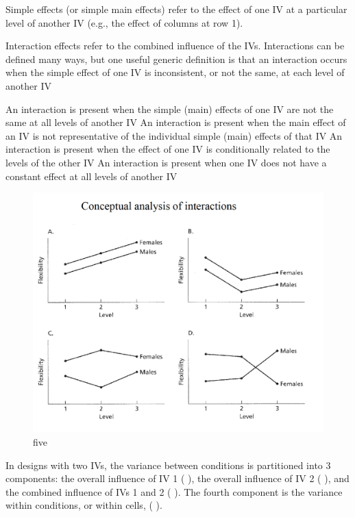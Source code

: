 \documentclass[]{book}
\theoremstyle{definition}
\theoremstyle{definition}
\theoremstyle{definition}
\theoremstyle{remark}
\begin{document}
Simple effects (or simple main effects) refer to the effect of one IV at
a particular level of another IV (e.g., the effect of columns at row 1).

Interaction effects refer to the combined influence of the IVs.
Interactions can be defined many ways, but one useful generic definition
is that an interaction occurs when the simple effect of one IV is
inconsistent, or not the same, at each level of another IV

An interaction is present when the simple (main) effects of one IV are
not the same at all levels of another IV An interaction is present when
the main effect of an IV is not representative of the individual simple
(main) effects of that IV An interaction is present when the effect of
one IV is conditionally related to the levels of the other IV An
interaction is present when one IV does not have a constant effect at
all levels of another IV

\begin{figure}
\centering
\includegraphics{img/hicksfa5.png}
\caption{five}
\end{figure}

In designs with two IVs, the variance between conditions is partitioned
into 3 components: the overall influence of IV 1 ( ), the overall
influence of IV 2 ( ), and the combined influence of IVs 1 and 2 ( ).
The fourth component is the variance within conditions, or within cells,
( ).
\end{document}
